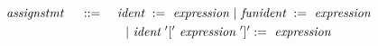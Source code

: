 \[ \begin{aligned}
	~\emph{assignstmt}~ \quad ::= \quad
		& ~\emph{ident}~ := ~\emph{expression}~ | ~\emph{funident}~ := ~\emph{expression}~  \\
		& \quad | ~\emph{ident}~ '[' ~\emph{expression}~ ']' := ~\emph{expression}~
\end{aligned} \]